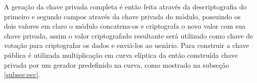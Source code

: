 %
A geração da chave privada completa é então feita através da descriptografia do primeiro e segundo campos através da chave privada do módulo, possuindo os dois valores em claro o módulo concatena-os e criptografa o novo valor com sua chave privada, assim o valor criptografado resultante será utilizado como chave de votação para criptografar os dados e enviá-los ao usuário. Para construir a chave pública é utilizada multiplicação em curva elíptica da então construída chave privada por um gerador predefinido na curva, como mostrado na subseção \ref{subsec:ecc}.

%



